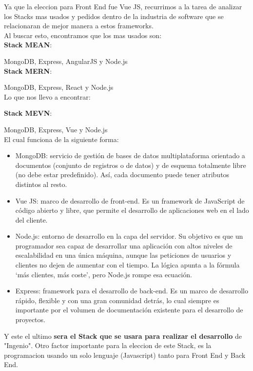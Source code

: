 \documentclass[a4paper,12 pt]{article}
\begin{document}
Ya que la eleccion para Front End fue  Vue JS, recurrimos a la tarea de analizar
los Stacks mas usados y pedidos dentro de la industria de software que se
relacionaran de mejor manera a estos frameworks.\\

Al buscar esto, encontramos que los mas usados son:\\ 

\textbf{Stack MEAN}:

MongoDB, Express, AngularJS y Node.js\\

\textbf{Stack MERN}:

MongoDB, Express, React y Node.js\\

Lo que nos llevo a encontrar:

\textbf{Stack MEVN}:

MongoDB, Express, Vue y Node.js\\


El cual funciona de la siguiente forma:
\begin{itemize}
\item MongoDB: servicio de gestión de bases de datos multiplataforma orientado a
documentos (conjunto de registros o de datos) y de esquema totalmente libre (no
debe estar predefinido). Así, cada documento puede tener atributos distintos al
resto.
\item Vue JS: marco de desarrollo de front-end. Es un framework de JavaScript de
código abierto y libre, que permite el desarrollo de aplicaciones web en el lado
del cliente.
\item Node.js: entorno de desarrollo en la capa del servidor. Su objetivo es que
un programador sea capaz de desarrollar una aplicación con altos niveles de
escalabilidad en una única máquina, aunque las peticiones de usuarios y clientes
no dejen de aumentar con el tiempo.  La lógica apunta a la fórmula ‘más
clientes, más coste’, pero Node.js rompe esa ecuación.
\item Express: framework para el desarrollo de back-end. Es un marco de
desarrollo rápido, flexible y con una gran comunidad detrás, lo cual siempre es
importante por el volumen de documentación existente para el desarrollo de
proyectos.
\end{itemize}

Y este el ultimo \textbf{sera el Stack que se usara para realizar el desarrollo}
de "Ingenio". Otro factor importante para la eleccion de este Stack, es la
programacion usando un solo lenguaje (Javascript) tanto para Front End y Back
End.
\end{document}
